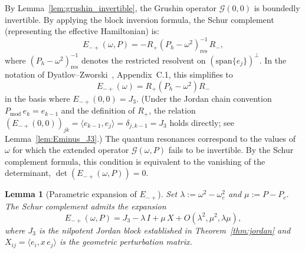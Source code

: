 \documentclass[12pt,a4paper]{amsart}
\newtheorem{lemma}[theorem]{Lemma}
\theoremstyle{remark}
\begin{document}
By Lemma~\ref{lem:grushin_invertible}, the Grushin operator $\mathcal{G}(0,0)$ is boundedly invertible.
By applying the block inversion formula, the Schur complement (representing the effective Hamiltonian) is:
\[
  E_{-+}(\omega, P) = -R_+(P_h - \omega^2)^{-1}_{\mathrm{res}}\,R_- ,
\]
where $(P_h-\omega^2)^{-1}_{\mathrm{res}}$ denotes the restricted resolvent on
$(\mathrm{span}\{e_j\})^\perp$. In the notation of Dyatlov--Zworski~\cite{DZ19}, Appendix~C.1,
this simplifies to
\[
  E_{-+}(\omega) = R_+(P_h - \omega^2)R_-
\]
in the basis where $E_{-+}(0,0) = J_3$.
(Under the Jordan chain convention $P_{\mathrm{mod}}\,e_k = e_{k-1}$ and
the definition of $R_+$, the relation $(E_{-+}(0,0))_{jk} = \langle e_{k-1}, e_j\rangle = \delta_{j,k-1} = J_3$
holds directly; see Lemma~\ref{lem:Eminus_J3}.)
The quantum resonances correspond to the values of $\omega$ for which the extended operator
$\mathcal{G}(\omega,P)$ fails to be invertible. By the Schur complement formula, this condition is
equivalent to the vanishing of the determinant, $\det(E_{-+}(\omega,P)) = 0$.

\begin{lemma}[Parametric expansion of $E_{-+}$]
\label{lem:Epm_expand}
Set $\lambda := \omega^2 - \omega_c^2$ and $\mu := P - P_c$.
The Schur complement admits the expansion
\begin{equation}\label{eq:lambda_def}
  E_{-+}(\omega, P) = J_3 - \lambda\,I + \mu\,X + O(\lambda^2, \mu^2, \lambda\mu),
\end{equation}
where $J_3$ is the nilpotent Jordan block established in Theorem~\ref{thm:jordan} and
$X_{ij} = \langle e_i, x\,e_j\rangle$ is the geometric perturbation matrix.
\end{lemma}
\end{document}
